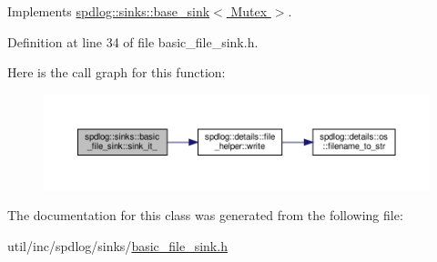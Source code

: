 Implements \hyperlink{classspdlog_1_1sinks_1_1base__sink_ad698d300cb7f5e58b2aa1b9907cdbd87}{spdlog\+::sinks\+::base\+\_\+sink$<$ Mutex $>$}.



Definition at line 34 of file basic\+\_\+file\+\_\+sink.\+h.

Here is the call graph for this function\+:
\nopagebreak
\begin{figure}[H]
\begin{center}
\leavevmode
\includegraphics[width=350pt]{classspdlog_1_1sinks_1_1basic__file__sink_a8d9239f225478ade4e879dc643f577ba_cgraph}
\end{center}
\end{figure}


The documentation for this class was generated from the following file\+:\begin{DoxyCompactItemize}
\item 
util/inc/spdlog/sinks/\hyperlink{basic__file__sink_8h}{basic\+\_\+file\+\_\+sink.\+h}\end{DoxyCompactItemize}
